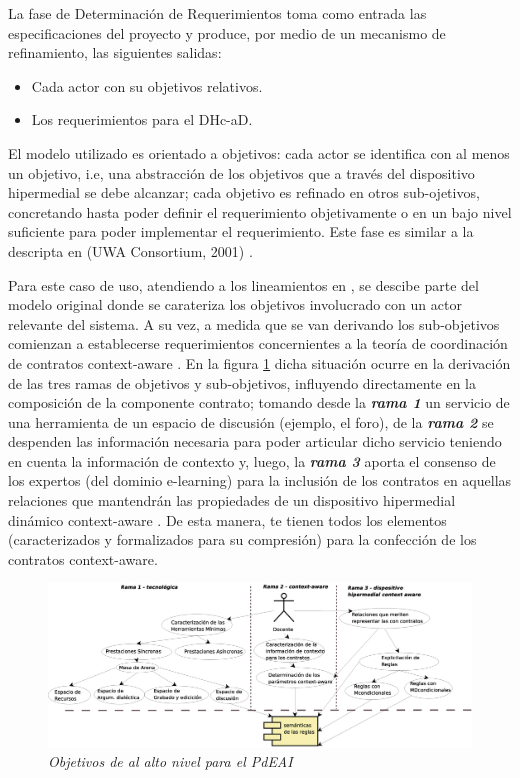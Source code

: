 \documentclass{llncs}
\begin{document}
La fase de Determinación de Requerimientos toma como entrada las especificaciones del proyecto y produce, por medio de un mecanismo de refinamiento, las siguientes salidas:
\begin{itemize}
 \item  Cada actor con su objetivos relativos.
 \item  Los requerimientos para el DHc-aD.
\end{itemize}
 
El modelo utilizado es orientado a objetivos: cada actor se identifica con al menos un objetivo, i.e, una abstracción de los objetivos que a través del dispositivo hipermedial se debe alcanzar; cada objetivo es refinado en otros sub-ojetivos, concretando hasta poder definir el requerimiento objetivamente o en un bajo nivel suficiente para poder implementar el requerimiento. Este fase es similar a la descripta en (UWA Consortium, 2001) \cite{UWA}. 

Para este caso de uso, atendiendo a los lineamientos en \cite{libro7}, se descibe parte del modelo original donde se carateriza los objetivos involucrado con un actor relevante del sistema. A su vez, a medida que se van derivando los sub-objetivos comienzan a establecerse requerimientos concernientes a la teoría de coordinación de contratos context-aware \cite{libro5,contratos}. En la figura \ref{requerimientos} dicha situación ocurre en la derivación de las tres ramas de objetivos y sub-objetivos, influyendo directamente en la composición de la componente contrato; tomando desde la \textit{\textbf{rama 1}} un servicio de una herramienta de un espacio de discusión (ejemplo, el foro), de la \textit{\textbf{rama 2}} se despenden las información necesaria para poder articular dicho servicio teniendo en cuenta la información de contexto y, luego,  la \textit{\textbf{rama 3}} aporta el consenso de los expertos (del dominio e-learning) para la inclusión de los contratos en aquellas relaciones que mantendrán las propiedades de un dispositivo hipermedial dinámico context-aware \cite{libro5}. De esta manera, te tienen todos los elementos (caracterizados y formalizados para su compresión) para la confección de los contratos context-aware.

	\begin{figure}[!h]
        	\begin{center}
		\includegraphics[width= 6 in,totalheight=3 in]{Requerimientos.eps}
                \caption{\small \sl Objetivos de al alto nivel  para el PdEAI} \label{requerimientos}
         	\end{center}
         \end{figure}
\end{document}
